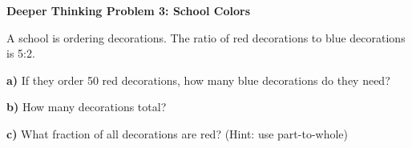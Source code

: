 \documentclass[12pt, letterpaper, fleqn]{article}
\begin{document}
\begin{tcolorbox}[colback=white!15, colframe=black, boxrule=1.5pt, arc=4mm, left=6mm, right=6mm, top=5mm, bottom=5mm]

\textbf{Deeper Thinking Problem 3: School Colors}

\medskip

\noindent
A school is ordering decorations. The ratio of red decorations to blue decorations is 5:2.
\noindent
\vspace{1cm}

\textbf{a)} If they order 50 red decorations, how many blue decorations do they need?

\vspace{2cm}
\vspace{3cm}

\noindent
\textbf{b)} How many decorations total?
\vspace{2cm}
\vspace{3cm}

\noindent
\textbf{c)} What fraction of all decorations are red? (Hint: use part-to-whole)
\vspace{2cm}
\vspace{3cm}

\end{tcolorbox}
\end{document}

